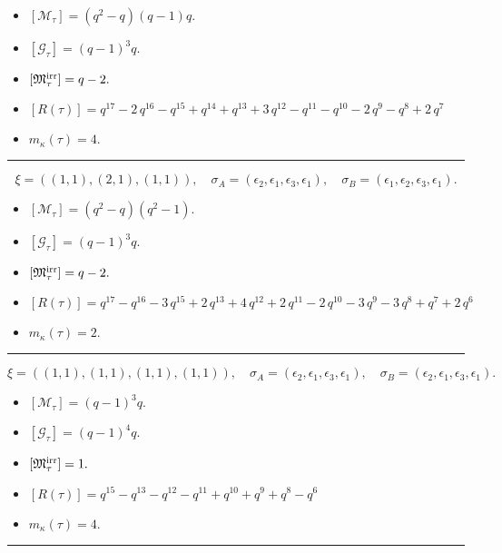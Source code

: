 \documentclass[10pt,a4paper]{amsart}
\begin{document}
\begin{itemize}
 \item $[\mathcal{M}_{\tau}] = {\left(q^{2} - q\right)} {\left(q - 1\right)} q .$

 \item $[\mathcal{G}_{\tau}] = {\left(q - 1\right)}^{3} q .$

 \item $[{\frak M}_{\tau}^{\textrm{irr}}] = q - 2 .$

 \item $[R(\tau)] = q^{17} - 2 \, q^{16} - q^{15} + q^{14} + q^{13} + 3 \, q^{12} - q^{11} - q^{10} - 2 \, q^{9} - q^{8} + 2 \, q^{7} $

 \item $m_{\kappa}(\tau) = 4 .$

 \end{itemize}
\noindent\rule{8cm}{0.4pt}

$$\xi = ({(1, 1)}, {(2, 1)}, {(1, 1)}),\quad \sigma_A = ({{\epsilon_2}}, {{\epsilon_1, \epsilon_3}}, {{\epsilon_1}}),\quad \sigma_B = ({{\epsilon_1}}, {{\epsilon_2, \epsilon_3}}, {{\epsilon_1}}).$$

\begin{itemize}
 \item $[\mathcal{M}_{\tau}] = {\left(q^{2} - q\right)} {\left(q^{2} - 1\right)} .$

 \item $[\mathcal{G}_{\tau}] = {\left(q - 1\right)}^{3} q .$

 \item $[{\frak M}_{\tau}^{\textrm{irr}}] = q - 2 .$

 \item $[R(\tau)] = q^{17} - q^{16} - 3 \, q^{15} + 2 \, q^{13} + 4 \, q^{12} + 2 \, q^{11} - 2 \, q^{10} - 3 \, q^{9} - 3 \, q^{8} + q^{7} + 2 \, q^{6} $

 \item $m_{\kappa}(\tau) = 2 .$

 \end{itemize}
\noindent\rule{8cm}{0.4pt}

$$\xi = ({(1, 1)}, {(1, 1), (1, 1)}, {(1, 1)}),\quad \sigma_A = ({{\epsilon_2}}, {{\epsilon_1}, {\epsilon_3}}, {{\epsilon_1}}),\quad \sigma_B = ({{\epsilon_2}}, {{\epsilon_1}, {\epsilon_3}}, {{\epsilon_1}}).$$

\begin{itemize}
 \item $[\mathcal{M}_{\tau}] = {\left(q - 1\right)}^{3} q .$

 \item $[\mathcal{G}_{\tau}] = {\left(q - 1\right)}^{4} q .$

 \item $[{\frak M}_{\tau}^{\textrm{irr}}] = 1 .$

 \item $[R(\tau)] = q^{15} - q^{13} - q^{12} - q^{11} + q^{10} + q^{9} + q^{8} - q^{6} $

 \item $m_{\kappa}(\tau) = 4 .$

 \end{itemize}
\noindent\rule{8cm}{0.4pt}
\end{document}
